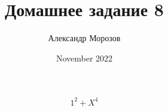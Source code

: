\documentclass{article}
\title{Домашнее задание 8}
\author{Александр Морозов}
\date{November 2022}
\begin{document}
    \[{{{1}^{2}}+{{X}^{4}}}\]

	
\end{document}
